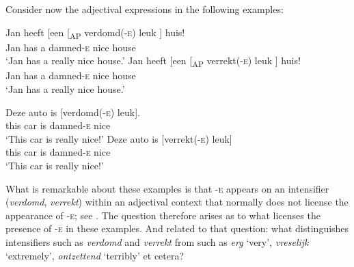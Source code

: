 \documentclass[output=paper]{langsci/langscibook}
\begin{document}
Consider now the adjectival expressions in the following examples:

\ea%
    \label{ex:key:18.58}
	\ea
	\gll  Jan  heeft    [een    [\textsubscript{AP}  verdomd(\textsc{-e})  leuk ]    huis!\\
		Jan    has        a         {}       damned-\textsc{e}      nice {}   house\\
	\glt \enquote*{Jan has a really nice house.}
	\ex
	\gll  Jan  heeft  [een    [\textsubscript{AP}  verrekt(\textsc{-e})  leuk ]  huis!\\
    Jan    has      a      {}          damned-\textsc{e}    nice {} house\\
	\glt \enquote*{Jan has a really nice house.}
	\z
\z

\ea%
    \label{ex:key:18.59}
	\ea
	\gll Deze    auto    is    [verdomd(\textsc{-e})  leuk].\\
		this      car      is    damned-\textsc{e}        nice\\
	\glt \enquote*{This car is really nice!}
	\ex
	\gll Deze    auto    is    [verrekt(\textsc{-e})    leuk]\\
		this      car      is    damned-\textsc{e}      nice\\
	\glt \enquote*{This car is really nice!}
	\z
\z

What is remarkable about these examples is that \textsc{-e} appears on an
intensifier (\emph{verdomd}, \emph{verrekt}) within an adjectival context that
normally does not license the appearance of \textsc{-e}; see .
The question therefore arises as to what licenses the presence of \textsc{-e}
in these examples. And related to that question: what distinguishes
intensifiers such as \emph{verdomd} and \emph{verrekt} from  such
as \emph{erg} \enquote*{very}, \emph{vreselijk} \enquote*{extremely},
\emph{ontzettend} \enquote*{terribly} et cetera?\largerpage[-1]
\end{document}
